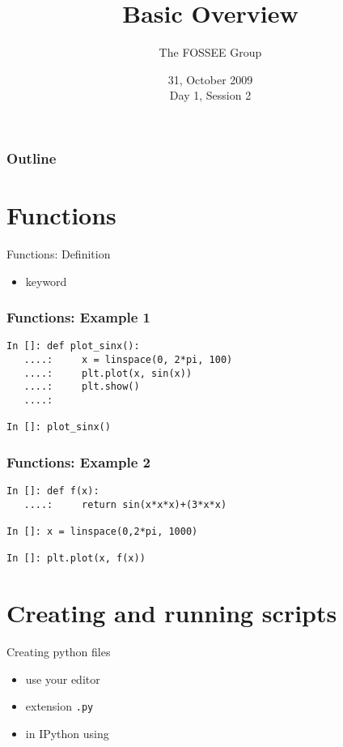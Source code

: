 \documentclass[14pt,compress]{beamer}
\title[Basic Python]{Basic Overview\\}
\author[FOSEE Team] {The FOSSEE Group}
\institute[IIT Bombay] {Department of Aerospace Engineering\\IIT Bombay}
\date[] {31, October 2009\\Day 1, Session 2}
\newcounter{time}
\newcommand{\inctime}[1]{\addtocounter{time}{#1}{\tiny \thetime\ m}}
\newcommand{\typ}[1]{\lstinline{#1}}
\newcommand{\kwrd}[1]{ \texttt{\textbf{\color{blue}{#1}}}  }
\begin{document}
\begin{frame}
  \titlepage
\end{frame}

\begin{frame}
  \frametitle{Outline}
  \tableofcontents
\end{frame}

\section{Functions}
\begin{frame}{Functions: Definition}
\begin{itemize}
  \item \kwrd{def} keyword
\end{itemize}
\end{frame}

\begin{frame}[fragile]
\frametitle{Functions: Example 1}
  \begin{lstlisting}
In []: def plot_sinx():
   ....:     x = linspace(0, 2*pi, 100)
   ....:     plt.plot(x, sin(x))
   ....:     plt.show()
   ....:    

In []: plot_sinx()
  \end{lstlisting}
\end{frame}

\begin{frame}[fragile]
\frametitle{Functions: Example 2}
  \begin{lstlisting}
In []: def f(x):
   ....:     return sin(x*x*x)+(3*x*x)

In []: x = linspace(0,2*pi, 1000)

In []: plt.plot(x, f(x))
  \end{lstlisting}
  \inctime{10}
\end{frame}


\section{Creating and running scripts}
\begin{frame}
  {Creating python files}
  \begin{itemize}
    \item use your editor
    \item extension \typ{.py}
    \item in IPython using \kwrd{\%run}
  \end{itemize}
\inctime{5}
\end{frame}
\end{document}
